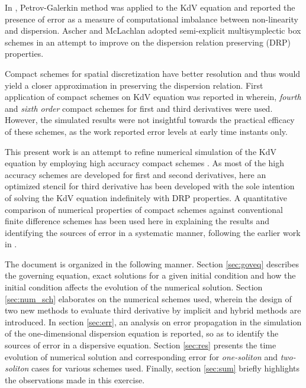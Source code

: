 In \cite{Argyris1987}, Petrov-Galerkin method was applied to the KdV equation and reported the presence of error as a measure of computational imbalance between non-linearity and dispersion. Ascher and McLachlan \cite{Ascher2004} adopted semi-explicit multisymplectic box schemes in an attempt to improve on the dispersion relation preserving (DRP) properties.

Compact schemes for spatial discretization have better resolution and thus would yield a closer approximation in preserving the dispersion relation. First application of compact schemes on KdV equation was reported in \cite{Li2006} wherein, \emph{fourth} and \emph{sixth order} compact schemes for first and third derivatives were used. However, the simulated results were not insightful towards the practical efficacy of these schemes, as the work reported error levels at early time instants only.

This present work is an attempt to refine numerical simulation of the KdV equation by employing high accuracy compact schemes \cite{Sengupta2013a,Sengupta2006b}. As most of the high accuracy schemes are developed for first and second derivatives, here an optimized stencil for third derivative has been developed with the sole intention of solving the KdV equation indefinitely with DRP properties. A quantitative comparison of numerical properties of compact schemes against conventional finite difference schemes has been used here in explaining the results and identifying the sources of error in a systematic manner, following the earlier work in \cite{Sengupta2007}.

The document is organized in the following manner. Section \ref{sec:goveq} describes the governing equation, exact solutions for a given initial condition and how the initial condition affects the evolution of the numerical solution. Section \ref{sec:num_sch} elaborates on the numerical schemes used, wherein the design of two new methods to evaluate third derivative by implicit and hybrid methods are introduced. In section \ref{sec:err}, an analysis on error propagation in the simulation of the one-dimensional dispersion equation is reported, so as to identify the sources of error in a dispersive equation. Section \ref{sec:res} presents the time evolution of numerical solution and corresponding error for \emph{one-soliton} and \emph{two-soliton} cases for various schemes used. Finally, section \ref{sec:sum} briefly highlights the observations made in this exercise.
